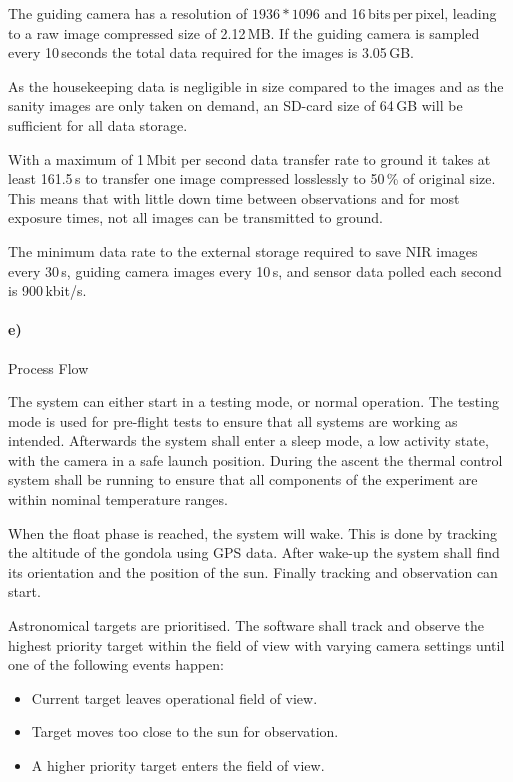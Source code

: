 The guiding camera has a resolution of $1936 * 1096$ and 16\,bits\,per\,pixel, leading to a raw image compressed size of 2.12\,MB. If the guiding camera is sampled every 10\,seconds the total data required for the images is 3.05\,GB.

As the housekeeping data is negligible in size compared to the images and as the sanity images are only taken on demand, an SD-card size of 64\,GB will be sufficient for all data storage.

With a maximum of 1\,Mbit per second data transfer rate to ground it takes at least 161.5\,s to transfer one image compressed losslessly to 50\,\% of original size. This means that with little down time between observations and for most exposure times, not all images can be transmitted to ground.

The minimum data rate to the external storage required to save NIR images every 30\,s, guiding camera images every 10\,s, and sensor data polled each second is 900\,kbit/s.


\paragraph{e)} Process Flow

The system can either start in a testing mode, or normal operation. The testing mode is used for pre-flight tests to ensure that all systems are working as intended. Afterwards the system shall enter a sleep mode, a low activity state, with the camera in a safe launch position. During the ascent the thermal control system shall be running to ensure that all components of the experiment are within nominal temperature ranges.

When the float phase is reached, the system will wake. This is done by tracking the altitude of the gondola using GPS data. After wake-up the system shall find its orientation and the position of the sun. Finally tracking and observation can start.

Astronomical targets are prioritised. The software shall track and observe the highest priority target within the field of view with varying camera settings until one of the following events happen:

\begin{itemize}
	\item Current target leaves operational field of view.
	\item Target moves too close to the sun for observation.
	\item A higher priority target enters the field of view.
\end{itemize}

